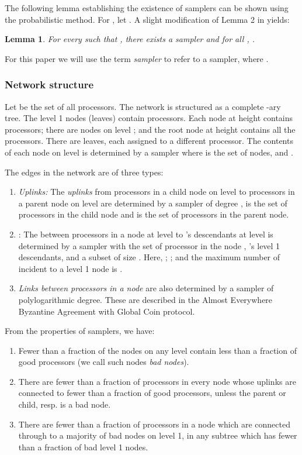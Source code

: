 \documentclass[letterpaper,11pt]{article}
\newtheorem{lemma}{Lemma}
\begin{document}
\medskip

The following lemma establishing the existence of samplers
can be shown using the probabilistic method.  For , 
let .  A slight modification of Lemma 2 in \cite{KKKSS-TALG} yields:

\begin{lemma} \label{l:samp2}
For every  
such that ,
there exists a 
sampler  and for all , .
 \end{lemma}

\medskip

For this paper we will use the term {\it sampler} to refer to a   sampler, where .




\subsubsection{Network structure}

Let  be the set of all  processors. 
The network is structured as a complete -ary  tree. The level 1 nodes (leaves) contain  processors.  Each node at height  contains  processors; there are  nodes on level ; and the root node at height  contains all the processors.  There are  leaves, each assigned to a different processor.  The contents of each node on level  is determined by  a sampler where  is the set of nodes,  and . 

The edges in the network are of three types:
\begin{enumerate}
\item
{\it Uplinks:}   The {\it uplinks}  from  processors in a child node on level   to processors in a parent node on level  are determined by a sampler
of degree  ,  is the set of processors in the child node and  is the set of processors in the parent node.  
\item
:  The   between  processors in a node  at level  to 's descendants at level  is determined by a sampler with  the set of processor in the node ,  's level 1 descendants, and  a subset of size .  Here, ; ; 
and the maximum number of  incident to  a level 1 node is .

\item
{\it Links between processors in a node} are also determined by a sampler of polylogarithmic degree. These are described in the Almost Everywhere Byzantine Agreement with Global Coin protocol. 
\end{enumerate}


From the properties of samplers,  we have: 
\begin{enumerate}
\item Fewer than a  fraction of the nodes on any level contain less than a  fraction of good processors (we call such nodes {\it bad nodes}). 
\item  There are fewer than a  fraction of processors in every node whose uplinks are connected to fewer than a  fraction of good processors, unless the parent or child, resp. is a bad node.
\item
There are fewer than a  fraction of processors in a node which are connected  through  to a majority of bad nodes on level 1, in any subtree which has fewer than a  fraction of bad level 1 nodes. 
\end{enumerate}
\end{document}
